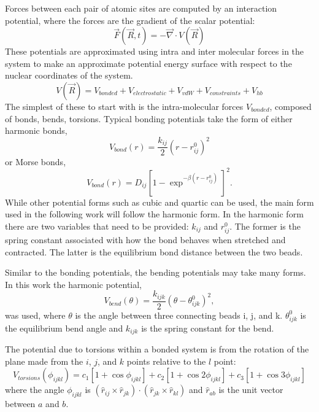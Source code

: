 Forces between each pair of atomic sites are computed by an interaction potential, where the forces are the gradient of the scalar potential:
\begin{equation}
\vec{F}(\vec{R},t) = -\vec{\nabla} \cdot V(\vec{R})
\end{equation}
These potentials are approximated using intra and inter molecular forces in the system to make an approximate potential energy surface with respect to the nuclear coordinates of the system.\cite{Leach2001} 
\begin{equation}
   V(\vec{R}) = V_{bonded} + V_{electrostatic} + V_{vdW} + V_{constraints} + V_{hb}     
\end{equation}
The simplest of these to start with is the intra-molecular forces $V_{bonded}$, composed of bonds, bends, torsions. Typical bonding potentials take the form of either harmonic bonds,
\begin{equation}
    V_{bond}(r) = \frac{k_{ij}}{2} (r - r_{ij}^0)^2
\end{equation}
or Morse bonds,
\begin{equation}
    V_{bond}(r) = D_{ij} [1 - \exp^{-\beta (r - r_{ij}^0)}]^2 .
\end{equation}
While other potential forms such as cubic and quartic can be used, the main form used in the following work will follow the harmonic form. In the harmonic form there are two variables that need to be provided: $k_{ij}$ and $r_{ij}^0$. The former is the spring constant associated with how the bond behaves when stretched and contracted. The latter is the equilibrium bond distance between the two beads.

Similar to the bonding potentials, the bending potentials may take many forms. In this work the harmonic potential,
\begin{equation}
    V_{bend} (\theta) = \frac{k_{ijk}}{2} (\theta - \theta_{ijk}^0)^2,
\end{equation}
was used, where $\theta$ is the angle between three connecting beads i, j, and k. $\theta_{ijk}^0$ is the equilibrium bend angle and $k_{ijk}$ is the spring constant for the bend.

The potential due to torsions within a bonded system is from the rotation of the plane made from the $i$, $j$, and $k$ points relative to the $l$ point:
\begin{equation}
    V_{torsions} (\phi_{ijkl})= c_1 [1 + \cos{\phi_{ijkl}}] + c_2 [1 + \cos{2\phi_{ijkl}}] + c_3 [1 + \cos{3\phi_{ijkl}}]  
\end{equation}
where the angle $\phi_{ijkl}$ is $(\hat{r}_{ij} \times \hat{r}_{jk}) \cdot (\hat{r}_{jk} \times \hat{r}_{kl})$ and $\hat{r}_{ab}$ is the unit vector between $a$ and $b$.


